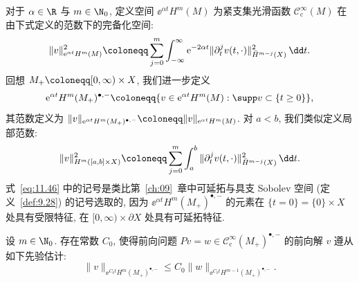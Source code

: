 \begin{definition}\label{def:11.13}
对于 $\alpha \in \R$ 与 $m \in \N_0$, 定义空间 $\ee^{\alpha t} H^m(M)$ 为紧支集光滑函数 $\mathcal{C}_{\mathrm{c}}^\infty(M)$ 在由下式定义的范数下的完备化空间:
\begin{equation}\label{eq:11.45}
    \|v\|_{\ee^{\alpha t} H^m(M)}^2 \defeq \sum_{j=0}^m \int_{-\infty}^\infty \ee^{-2\alpha t} \|\partial_t^j v(t, \cdot)\|_{\bar H^{m-j}(X)}^2 \,\dd t.
\end{equation}
回想 $M_+ \defeq [0, \infty) \times X$, 我们进一步定义
\begin{equation}\label{eq:11.46}
    \ee^{\alpha t} H^m(M_+)^{\bullet, -} \defeq \{v \in \ee^{\alpha t} H^m(M) : \supp v \subset \{t \ge 0\}\},
\end{equation}
其范数定义为 $\|v\|_{\ee^{\alpha t} H^m(M_+)^{\bullet, -}} \defeq \|v\|_{\ee^{\alpha t} H^m(M)}$. 对 $a < b$, 我们类似定义局部范数:
\begin{equation}\label{eq:11.47}
    \|v\|_{H^m([a, b] \times X)}^2 \defeq \sum_{j=0}^m \int_a^b \|\partial_t^j v(t, \cdot)\|_{\bar H^{m-j}(X)}^2 \,\dd t.
\end{equation}
式~\eqref{eq:11.46} 中的记号是类比第~\ref{ch:09}~章中可延拓与具支 Sobolev 空间 (定义~\ref{def:9.28}) 的记号选取的, 因为 $\ee^{\alpha t} H^m(M_+)^{\bullet, -}$ 的元素在 $\{t = 0\} = \{0\} \times X$ 处具有受限特征, 在 $[0, \infty) \times \partial X$ 处具有可延拓特征.
\end{definition}

\begin{lemma}[弱指数增长界]\label{lem:11.14}
设 $m \in \N_0$. 存在常数 $C_0$, 使得前向问题 $P v = w \in \mathcal{C}_{\mathrm{c}}^\infty(M_+)^{\bullet, -}$ 的前向解 $v$ 遵从如下先验估计:
\begin{equation}\label{eq:11.48}
    \|v\|_{\ee^{C_0 t} H^m(M_+)^{\bullet, -}} \le C_0 \|w\|_{\ee^{C_0 t} H^{m-1}(M_+)^{\bullet, -}}.
\end{equation}
\end{lemma}

